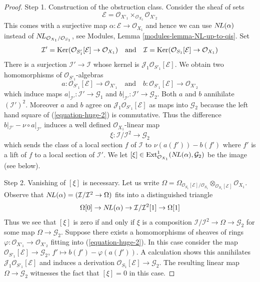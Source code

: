 \begin{proof}
\medskip\noindent
Step 1. Construction of the obstruction class. Consider the sheaf
of sets
$$
\mathcal{E} = \mathcal{O}_{X'_1} \times_{\mathcal{O}_{X_2}} \mathcal{O}_{X'_2}
$$
This comes with a surjective map $\alpha : \mathcal{E} \to \mathcal{O}_{X_1}$
and hence we can use $\mathop{N\!L}\nolimits(\alpha)$ instead of
$\mathop{N\!L}\nolimits_{\mathcal{O}_{X_1}/\mathcal{O}_{S_1}}$, see
Modules, Lemma \ref{modules-lemma-NL-up-to-qis}.
Set
$$
\mathcal{I}' =
\mathop{\mathrm{Ker}}(\mathcal{O}_{S'_1}[\mathcal{E}] \to \mathcal{O}_{X_1})
\quad\text{and}\quad
\mathcal{I} =
\mathop{\mathrm{Ker}}(\mathcal{O}_{S_1}[\mathcal{E}] \to \mathcal{O}_{X_1})
$$
There is a surjection $\mathcal{I}' \to \mathcal{I}$ whose kernel
is $\mathcal{J}_1\mathcal{O}_{S'_1}[\mathcal{E}]$.
We obtain two homomorphisms of $\mathcal{O}_{S'_1}$-algebras
$$
a : \mathcal{O}_{S'_1}[\mathcal{E}] \to \mathcal{O}_{X'_1}
\quad\text{and}\quad
b : \mathcal{O}_{S'_1}[\mathcal{E}] \to \mathcal{O}_{X'_2}
$$
which induce maps $a|_{\mathcal{I}'} : \mathcal{I}' \to \mathcal{G}_1$ and
$b|_{\mathcal{I}'} : \mathcal{I}' \to \mathcal{G}_2$. Both $a$ and $b$
annihilate $(\mathcal{I}')^2$. Moreover $a$ and $b$ agree on
$\mathcal{J}_1\mathcal{O}_{S'_1}[\mathcal{E}]$ as maps into $\mathcal{G}_2$
because the left hand square of (\ref{equation-huge-2}) is commutative.
Thus the difference
$b|_{\mathcal{I}'} - \nu \circ a|_{\mathcal{I}'}$
induces a well defined $\mathcal{O}_{X_1}$-linear map
$$
\xi : \mathcal{I}/\mathcal{I}^2 \longrightarrow \mathcal{G}_2
$$
which sends the class of a local section $f$ of $\mathcal{I}$ to
$\nu(a(f')) - b(f')$ where $f'$ is a lift of $f$ to a local
section of $\mathcal{I}'$. We let
$[\xi] \in \mathop{\mathrm{Ext}}\nolimits^1_{\mathcal{O}_{X_1}}(\mathop{N\!L}\nolimits(\alpha), \mathcal{G}_2)$
be the image (see below).

\medskip\noindent
Step 2. Vanishing of $[\xi]$ is necessary. Let us write
$\Omega = \Omega_{\mathcal{O}_{S_1}[\mathcal{E}]/\mathcal{O}_{S_1}}
\otimes_{\mathcal{O}_{S_1}[\mathcal{E}]} \mathcal{O}_{X_1}$.
Observe that $\mathop{N\!L}\nolimits(\alpha) = (\mathcal{I}/\mathcal{I}^2 \to \Omega)$
fits into a distinguished triangle
$$
\Omega[0] \to
\mathop{N\!L}\nolimits(\alpha) \to
\mathcal{I}/\mathcal{I}^2[1] \to
\Omega[1]
$$
Thus we see that $[\xi]$ is zero if and only if $\xi$
is a composition $\mathcal{I}/\mathcal{I}^2 \to \Omega \to \mathcal{G}_2$
for some map $\Omega \to \mathcal{G}_2$. Suppose there exists a
homomorphisms of sheaves of rings
$\varphi : \mathcal{O}_{X'_1} \to \mathcal{O}_{X'_2}$ fitting into
(\ref{equation-huge-2}). In this case consider the map
$\mathcal{O}_{S'_1}[\mathcal{E}] \to \mathcal{G}_2$,
$f' \mapsto b(f') - \varphi(a(f'))$. A calculation
shows this annihilates $\mathcal{J}_1\mathcal{O}_{S'_1}[\mathcal{E}]$
and induces a derivation $\mathcal{O}_{S_1}[\mathcal{E}] \to \mathcal{G}_2$.
The resulting linear map $\Omega \to \mathcal{G}_2$ witnesses the
fact that $[\xi] = 0$ in this case.


\end{proof}
